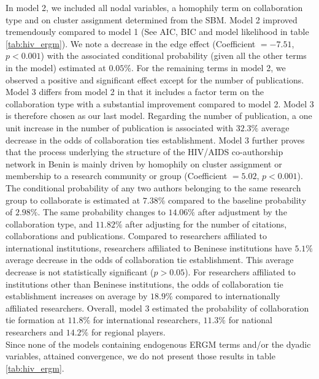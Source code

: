 In model 2, we included all nodal variables, a homophily term on collaboration type and on cluster assignment determined from the SBM. Model 2 improved tremendously compared to model 1 (See AIC, BIC and model likelihood in table \ref{tab:hiv_ergm}). We note a decrease in the edge effect (Coefficient $=-7.51$, $p<0.001$) with the associated conditional probability (given all the other terms in the model) estimated at $0.05\%$. For the remaining terms in model 2, we observed a positive and significant effect except for the number of publications. Model 3 differs from model 2 in that it includes a factor term on the collaboration type with a substantial improvement compared to model 2. Model 3 is therefore chosen as our last model. Regarding the number of publication, a one unit increase in the number of publication is associated with $32.3\%$ average decrease in the odds of collaboration ties establishment. Model 3 further proves that the process underlying the structure of the HIV/AIDS co-authorship network in Benin is mainly driven by homophily on cluster assignment or membership to a research community or group (Coefficient $=5.02$, $p<0.001$). The conditional probability of any two authors belonging to the same research group to collaborate is estimated at $7.38\%$ compared to the baseline probability of $2.98\%$. The same probability changes to $14.06\%$ after adjustment by the collaboration type, and $11.82\%$ after adjusting for the number of citations, collaborations and publications. Compared to researchers affiliated to international institutions, researchers affiliated to Beninese institutions have $5.1\%$ average decrease in the odds of collaboration tie establishment. This average decrease is not statistically significant ($p>0.05$). For researchers affiliated to institutions other than Beninese institutions, the odds of collaboration tie establishment increases on average by $18.9\%$ compared to internationally affiliated researchers. Overall, model 3 estimated the probability of collaboration tie formation at $11.8\%$ for international researchers, $11.3\%$ for national researchers and $14.2\%$ for regional players. \\
Since none of the models containing endogenous ERGM terms and/or the dyadic variables, attained convergence, we do not present those results in table \ref{tab:hiv_ergm}.

